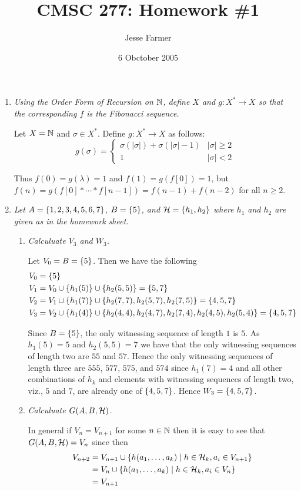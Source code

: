 \documentclass[10pt]{article}
\title{CMSC 277: Homework \#1}
\author{Jesse Farmer}
\date{6 Obctober 2005}
\begin{document}
\maketitle

\begin{enumerate}
\item \emph{Using the Order Form of Recursion on $\N$, define $X$ and $g : X^\ast \to X$ so that the corresponding
$f$ is the Fibonacci sequence.}

Let $X = \N$ and $\sigma \in X^\ast$.  Define $g: X^\ast \to X$ as follows:
\[
g(\sigma) = \begin{cases} \sigma(|\sigma|) + \sigma(|\sigma|-1) & |\sigma| \geq 2 \\ 1 & |\sigma| < 2 \end{cases}
\]

Thus $f(0) = g(\lambda) = 1$ and $f(1) = g(f[0]) = 1$, but $f(n) = g(f[0] \ast \cdots \ast f[n-1]) = f(n-1) + f(n-2)$ for all $n \geq 2$.

\item \emph{Let $A = \set{1,2,3,4,5,6,7}$, $B = \set{5}$, and $\cal{H} = \set{h_1,h_2}$ where $h_1$ and $h_2$ are given as in the homework sheet.}
\begin{enumerate}
\item \emph{Calculuate $V_3$ and $W_3$.}

Let $V_0 = B = \set{5}$.  Then we have the following
\begin{align*}
V_0 &= \set{5} \\
V_1 &= V_0 \cup \set{h_1(5)} \cup \set{h_2(5,5)} = \set{5,7} \\
V_2 &= V_1 \cup \set{h_1(7)} \cup \set{h_2(7,7), h_2(5,7), h_2(7,5)} = \set{4,5,7} \\
V_3 &= V_2 \cup \set{h_1(4)} \cup \set{h_2(4,4), h_2(4,7), h_2(7,4), h_2(4,5), h_2(5,4)} = \set{4,5,7}
\end{align*}

Since $B = \set{5}$, the only witnessing sequence of length $1$ is $5$.  As $h_1(5) = 5$ and $h_2(5,5) = 7$ we have that the only witnessing sequences of length two are $55$ and $57$.  Hence the only witnessing sequences of length three are $555$, $577$, $575$, and $574$ since $h_1(7)=4$ and all other combinations of $h_k$ and elements with witnessing sequences of length two, viz., $5$ and $7$, are already one of $\set{4,5,7}$.  Hence $W_3 = \set{4,5,7}$.
\item \emph{Calculuate $G(A,B,\cal{H})$.}

In general if $V_n = V_{n+1}$ for some $n \in \N$ then it is easy to see that $G(A,B,\cal{H}) = V_n$ since then
\begin{align*}
V_{n+2} &= V_{n+1} \cup \set{h(a_1, \ldots, a_k) \mid h \in \cal{H}_k, a_i \in V_{n+1}} \\
&= V_{n} \cup \set{h(a_1, \ldots, a_k) \mid h \in \cal{H}_k, a_i \in V_{n}} \\
&= V_{n+1}
\end{align*}


\end{enumerate}
\end{enumerate}
\end{document}
